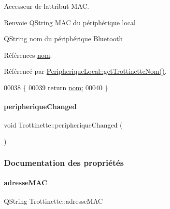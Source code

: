 Accesseur de l\textquotesingle{}attribut M\+AC.

\begin{DoxyReturn}{Renvoie}
Q\+String M\+AC du périphérique local

Q\+String nom du périphérique Bluetooth 
\end{DoxyReturn}


Références \hyperlink{class_trottinette_aab7d536bd21b3dbf0b9cca5508db40ab}{nom}.



Référencé par \hyperlink{class_peripherique_local_ac81a942b4d1d9e848649073c53ed6917}{Peripherique\+Local\+::get\+Trottinette\+Nom()}.


\begin{DoxyCode}
00038 \{
00039     \textcolor{keywordflow}{return} \hyperlink{class_trottinette_aab7d536bd21b3dbf0b9cca5508db40ab}{nom};
00040 \}
\end{DoxyCode}
\mbox{\label{class_trottinette_a44ae1514740ee0a1a55a9dab39c37aaf}} 
\paragraph{\texorpdfstring{peripherique\+Changed}{peripheriqueChanged}}
{\footnotesize\ttfamily void Trottinette\+::peripherique\+Changed (\begin{DoxyParamCaption}{ }\end{DoxyParamCaption})\hspace{0.3cm}{\ttfamily [signal]}}



\subsubsection{Documentation des propriétés}
\mbox{\label{class_trottinette_acd01acc5c1cbf23b9b527401282f1136}} 
\paragraph{\texorpdfstring{adresse\+M\+AC}{adresseMAC}}
{\footnotesize\ttfamily Q\+String Trottinette\+::adresse\+M\+AC\hspace{0.3cm}{\ttfamily [read]}}



